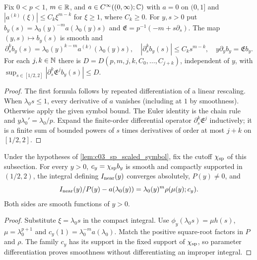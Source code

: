 \begin{lemma}
  \label{lem:c03_sp_scaled_symbol}
  Fix $0<p<1$, $m\in\mathbb{R}$, and $a\in C^\infty((0,\infty);\mathbb{C})$ with $a=0$ on $(0,1]$ and
  $|a^{(k)}(\xi)|\le C_k\xi^{m-k}$ for $\xi\ge1$, where $C_k\ge0$.
  For $y,s>0$ put $b_y(s)=\lambda_0(y)^{-m}a(\lambda_0(y)s)$ and
  $\mathfrak E=p^{-1}(-m+s\partial_s)$. The map $(y,s)\mapsto b_y(s)$ is smooth and
  \[
    \partial_s^k b_y(s)=\lambda_0(y)^{k-m}a^{(k)}(\lambda_0(y)s),\quad
    |\partial_s^kb_y(s)|\le C_ks^{m-k},\quad y\partial_yb_y=\mathfrak E b_y.
  \]
  For each $j,k\in\mathbb{N}$ there is $D=D(p,m,j,k,C_0,\ldots,C_{j+k})$, independent of $y$, with
  $\sup_{s\in[1/2,2]}|\partial_s^k\mathfrak E^j b_y(s)|\le D$.
\end{lemma}
\begin{proof}
  The first formula follows by repeated differentiation of a linear rescaling.
  When $\lambda_0s\le1$, every derivative of $a$ vanishes (including at $1$ by smoothness).
  Otherwise apply the given symbol bound. The Euler identity is the chain rule and
  $y\lambda_0'=\lambda_0/p$. Expand the finite-order differential operator
  $\partial_s^k\mathfrak E^j$ inductively; it is a finite sum of bounded powers of $s$
  times derivatives of order at most $j+k$ on $[1/2,2]$.
\end{proof}

\begin{lemma}
  \label{lem:c03_sp_near_rescaling}
  Under the hypotheses of \cref{lem:c03_sp_scaled_symbol}, fix the cutoff $\chi_{\rm sp}$ of this subsection.
  For every $y>0$, $c_y=\chi_{\rm sp}b_y$ is smooth and compactly supported in $(1/2,2)$,
  the integral defining $I_{\rm near}(y)$ converges absolutely, $P(y)\ne0$, and
  \[
    I_{\rm near}(y)/P(y)-a(\lambda_0(y))
      =\lambda_0(y)^m\rho(\mu(y);c_y).
  \]
  Both sides are smooth functions of $y>0$.
\end{lemma}
\begin{proof}
  Substitute $\xi=\lambda_0s$ in the compact integral. Use
  $\phi_y(\lambda_0s)=\mu h(s)$, $\mu=\lambda_0^{p+1}$ and $c_y(1)=\lambda_0^{-m}a(\lambda_0)$.
  Match the positive square-root factors in $P$ and $\rho$.
  The family $c_y$ has its support in the fixed support of $\chi_{\rm sp}$,
  so parameter differentiation proves smoothness without differentiating an improper integral.
\end{proof}

